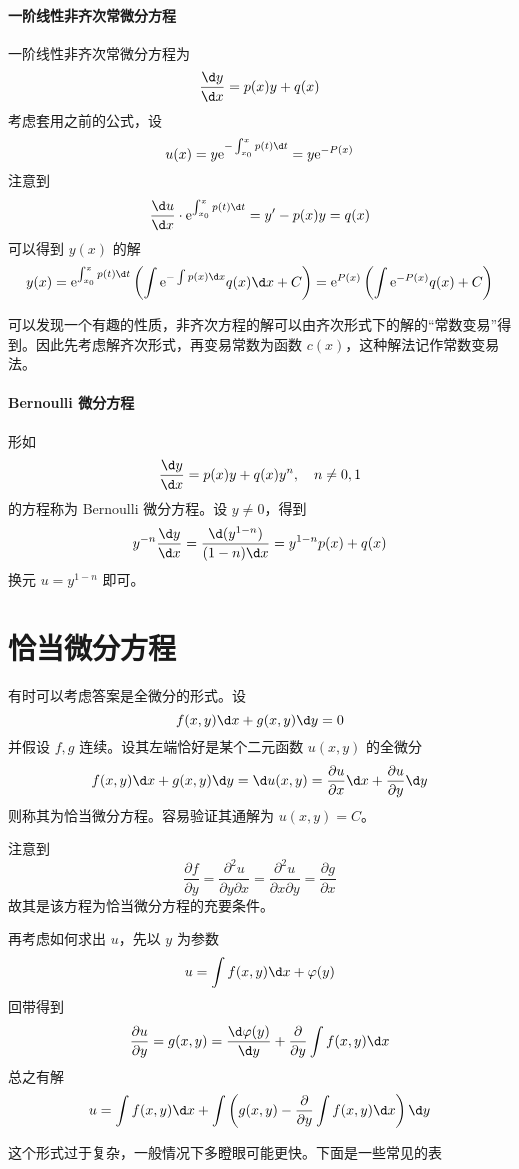 \paragraph{一阶线性非齐次常微分方程} 一阶线性非齐次常微分方程为
\[ \frac{\d y}{\d x} = p(x) y + q(x) \]
考虑套用之前的公式，设
\[ u(x) = y \ee^{-\int_{x_0}^{x} p(t) \d t} = y \ee^{-P(x)} \]
注意到
\[ \frac{\d u}{\d x} \cdot \ee^{\int_{x_0}^{x} p(t) \d t} = y' - p(x) y = q(x) \]
可以得到 $y(x)$ 的解
\[ y(x) = \ee^{\int_{x_0}^{x} p(t) \d t} \left(  \int \ee^{-\int p(x) \d x} q(x) \d x + C \right)
	= \ee^{P(x)} \left( \int \ee^{-P(x)} q(x) + C \right)  \]

可以发现一个有趣的性质，非齐次方程的解可以由齐次形式下的解的“常数变易”得到。因此先考虑解齐次形式，再变易常数为函数 $c(x)$，这种解法记作常数变易法。

\paragraph{Bernoulli 微分方程} 形如
\[ \frac{\d y}{\d x} = p(x) y + q(x) y^n, \quad n \neq 0,1 \]
的方程称为 Bernoulli 微分方程。设 $y \neq 0$，得到
\[ y^{-n} \frac{\d y}{\d x} = \frac{\d (y^{1-n})}{(1-n)\d x} = y^{1-n}p(x) + q(x) \]
换元 $u = y^{1-n}$ 即可。

\section{恰当微分方程}

有时可以考虑答案是全微分的形式。设
\[ f(x, y) \d x + g(x, y) \d y = 0 \]
并假设 $f, g$ 连续。设其左端恰好是某个二元函数 $u(x, y)$ 的全微分
\[ f(x, y) \d x + g(x, y) \d y = \d u(x, y) = \frac{\partial u}{\partial x} \d x + \frac{\partial u}{\partial y} \d y \]
则称其为恰当微分方程。容易验证其通解为 $u(x, y) = C$。

注意到
\[ \frac{\partial f}{\partial y} = \frac{\partial^2 u}{\partial y \partial x} = \frac{\partial^2 u}{\partial x \partial y} = \frac{\partial g}{\partial x} \]
故其是该方程为恰当微分方程的充要条件。

再考虑如何求出 $u$，先以 $y$ 为参数
\[ u = \int f(x, y) \d x + \varphi(y) \]
回带得到
\[ \frac{\partial u}{\partial y} = g(x, y) = \frac{\d \varphi(y)}{\d y} + \frac{\partial}{\partial y}\int f(x, y) \d x \]
总之有解
\[ u = \int f(x, y) \d x + \int \left( g(x, y) - \frac{\partial}{\partial y}\int f(x, y) \d x  \right) \d y \]

这个形式过于复杂，一般情况下多瞪眼可能更快。下面是一些常见的表

